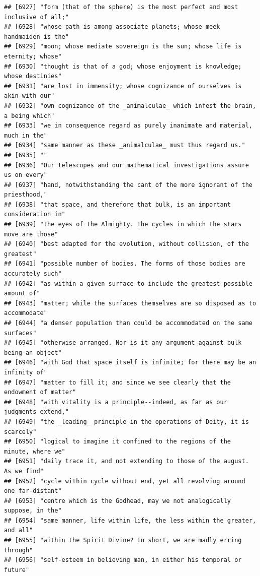 \documentclass{article}\usepackage[]{graphicx}\usepackage[]{color}
\makeatletter
\newenvironment{kframe}{%
 \def\at@end@of@kframe{}%
 \ifinner\ifhmode%
  \def\at@end@of@kframe{\end{minipage}}%
  \begin{minipage}{\columnwidth}%
 \fi\fi%
 \def\FrameCommand##1{\hskip\@totalleftmargin \hskip-\fboxsep
 \colorbox{shadecolor}{##1}\hskip-\fboxsep
     \hskip-\linewidth \hskip-\@totalleftmargin \hskip\columnwidth}%
 \MakeFramed {\advance\hsize-\width
   \@totalleftmargin\z@ \linewidth\hsize
   \@setminipage}}%
 {\par\unskip\endMakeFramed%
 \at@end@of@kframe}
\newenvironment{knitrout}{}{} %
\makeatother
\begin{document}
\begin{knitrout}
\begin{kframe}
\begin{verbatim}
## [6927] "form (that of the sphere) is the most perfect and most inclusive of all;"    
## [6928] "whose path is among associate planets; whose meek handmaiden is the"         
## [6929] "moon; whose mediate sovereign is the sun; whose life is eternity; whose"     
## [6930] "thought is that of a god; whose enjoyment is knowledge; whose destinies"     
## [6931] "are lost in immensity; whose cognizance of ourselves is akin with our"       
## [6932] "own cognizance of the _animalculae_ which infest the brain, a being which"   
## [6933] "we in consequence regard as purely inanimate and material, much in the"      
## [6934] "same manner as these _animalculae_ must thus regard us."                     
## [6935] ""                                                                            
## [6936] "Our telescopes and our mathematical investigations assure us on every"       
## [6937] "hand, notwithstanding the cant of the more ignorant of the priesthood,"      
## [6938] "that space, and therefore that bulk, is an important consideration in"       
## [6939] "the eyes of the Almighty. The cycles in which the stars move are those"      
## [6940] "best adapted for the evolution, without collision, of the greatest"          
## [6941] "possible number of bodies. The forms of those bodies are accurately such"    
## [6942] "as within a given surface to include the greatest possible amount of"        
## [6943] "matter; while the surfaces themselves are so disposed as to accommodate"     
## [6944] "a denser population than could be accommodated on the same surfaces"         
## [6945] "otherwise arranged. Nor is it any argument against bulk being an object"     
## [6946] "with God that space itself is infinite; for there may be an infinity of"     
## [6947] "matter to fill it; and since we see clearly that the endowment of matter"    
## [6948] "with vitality is a principle--indeed, as far as our judgments extend,"       
## [6949] "the _leading_ principle in the operations of Deity, it is scarcely"          
## [6950] "logical to imagine it confined to the regions of the minute, where we"       
## [6951] "daily trace it, and not extending to those of the august. As we find"        
## [6952] "cycle within cycle without end, yet all revolving around one far-distant"    
## [6953] "centre which is the Godhead, may we not analogically suppose, in the"        
## [6954] "same manner, life within life, the less within the greater, and all"         
## [6955] "within the Spirit Divine? In short, we are madly erring through"             
## [6956] "self-esteem in believing man, in either his temporal or future"              

\end{verbatim}
\end{kframe}
\end{knitrout}
\end{document}
